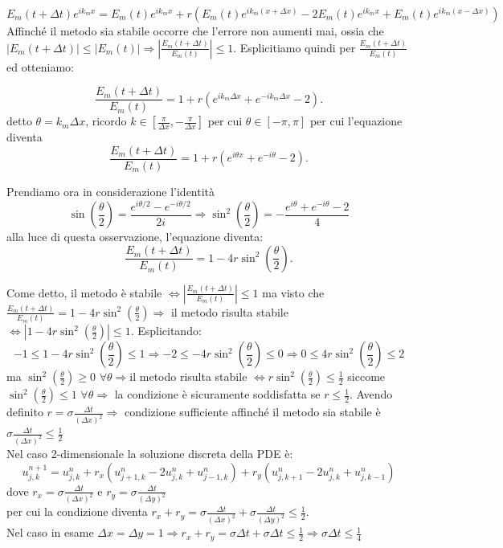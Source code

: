$$
E_{m}(t+\Delta t)e^{ik_{m}x}=E_{m}(t)e^{ik_{m}x}+r(E_{m}(t)e^{ik_{m}(x+\Delta x)}-2E_{m}(t)e^{ik_{m}x}+E_{m}(t)e^{ik_{m}(x-\Delta x)})
$$
Affinché il metodo sia stabile occorre che l'errore non aumenti mai, ossia che\\
\vspace{0.25em}
$|E_{m}(t+\Delta t)|\leq |E_{m}(t)| \Rightarrow |\frac{E_{m}(t+\Delta t)}{E_{m}(t)}|\leq 1$. Esplicitiamo quindi per $\frac{E_{m}(t+\Delta t)}{E_{m}(t)}$ ed otteniamo:

$$
\frac {E_{m}(t+\Delta t)}{E_{m}(t)}=1+r(e^{ik_{m}\Delta x}+e^{-ik_{m}\Delta x}-2).
$$
detto $\theta =k_{m}\Delta x$, ricordo $k\in [\frac{\pi}{\Delta x},-\frac{\pi}{\Delta x}]$ per cui $\theta \in [-\pi ,\pi ]$
per cui l'equazione diventa
$$
\frac {E_{m}(t+\Delta t)}{E_{m}(t)}=1+r(e^{i\theta x}+e^{-i\theta}-2).
$$

Prendiamo ora in considerazione l'identità 
$$
\sin \left({\frac {\theta }{2}}\right)={\frac {e^{i\theta /2}-e^{-i\theta /2}}{2i}} \Rightarrow
\sin ^{2}\left({\frac {\theta }{2}}\right)=-{\frac {e^{i\theta }+e^{-i\theta }-2}{4}}
$$
alla luce di questa osservazione, l'equazione diventa:
$$
\frac {E_{m}(t+\Delta t)}{E_{m}(t)}=1-4r\sin^2(\frac{\theta}{2}).
$$

Come detto, il metodo è stabile $\Leftrightarrow|\frac{E_{m}(t+\Delta t)}{E_{m}(t)}|\leq 1$ ma visto che $\frac {E_{m}(t+\Delta t)}{E_{m}(t)}=1-4r\sin^2(\frac{\theta}{2})\Rightarrow$ il metodo risulta stabile $\Leftrightarrow|1-4r\sin^2(\frac{\theta}{2})|\leq1$. Esplicitando:
$$
-1\leq 1-4r\sin^2(\frac{\theta}{2})\leq 1 \Rightarrow-2\leq -4r\sin^2(\frac{\theta}{2})\leq 0 \Rightarrow 0\leq 4r\sin^2(\frac{\theta}{2})\leq 2
$$
ma $\sin^2(\frac{\theta}{2})\ge0$ $\forall\theta\Rightarrow$il metodo risulta stabile $\Leftrightarrow r\sin^2(\frac{\theta}{2})\leq\frac{1}{2}$ siccome $\sin^2(\frac{\theta}{2})\leq1$ $\forall\theta\Rightarrow$ la condizione è sicuramente soddisfatta se $r\leq\frac{1}{2}$.
Avendo definito $r=\sigma \frac{\Delta t}{(\Delta x)^2} \Rightarrow$ condizione sufficiente affinché il metodo sia stabile è $\sigma \frac{\Delta t}{(\Delta x)^2}\leq\frac{1}{2}$\\
\vspace{1em}
Nel caso 2-dimensionale la soluzione discreta della PDE è:
$$
u_{j,k}^{n+1}=u_{j,k}^{n}+r_{x}(u_{j+1,k}^{n}-2u_{j,k}^{n}+u_{j-1,k}^{n})+r_{y}(u_{j,k+1}^{n}-2u_{j,k}^{n}+u_{j,k-1}^{n})
$$
dove $r_{x}=\sigma \frac{\Delta t}{(\Delta x)^2}$ e $r_{y}=\sigma \frac{\Delta t}{(\Delta y)^2}$\\ per cui la condizione diventa $r_{x}+r_{y}=\sigma \frac{\Delta t}{(\Delta x)^2}+\sigma \frac{\Delta t}{(\Delta y)^2}\leq\frac{1}{2}$.\\
Nel caso in esame $\Delta x=\Delta y=1 \Rightarrow r_{x}+r_{y}=\sigma \Delta t+\sigma \Delta t\leq\frac{1}{2} \Rightarrow \sigma\Delta t\leq \frac{1}{4}$

